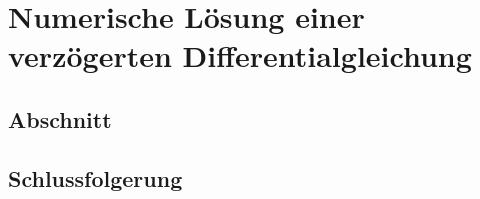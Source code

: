 %
%
%
\chapter{Numerische Lösung einer verzögerten Differentialgleichung\label{chapter:verzoegert}}
\begin{refsection}

\section{Abschnitt}

\section{Schlussfolgerung}

\printbibliography[heading=subbibliography]
\end{refsection}
